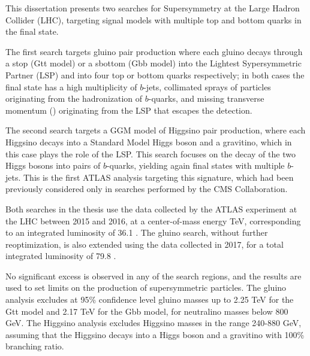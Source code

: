 This dissertation presents two searches for Supersymmetry at the Large Hadron Collider (LHC), targeting signal models with multiple top and bottom quarks in the final state.

The first search targets gluino pair production where each gluino decays through a stop
(Gtt model) or a sbottom (Gbb model) into the Lightest Sypersymmetric Partner (LSP) and into four top or bottom quarks respectively;
in both cases the final state has a high multiplicity of $b$-jets, collimated 
sprays of particles originating from the hadronization of $b$-quarks, and 
missing transverse momentum (\met) originating from the LSP  
that escapes the detection. 

The second search targets a GGM model of Higgsino pair production, 
where each Higgsino decays into a Standard Model Higgs boson and 
a gravitino, which in this case plays the role of the LSP. 
This search focuses on the decay of the two Higgs bosons into pairs of $b$-quarks, yielding again final states with multiple $b$-jets.
This is the first ATLAS analysis targeting this signature, which had been 
previously considered only in searches performed by the CMS Collaboration.

Both searches in the thesis use the data collected by the ATLAS experiment at the LHC 
between 2015 and 2016, at a center-of-mass energy  \cmtre TeV,
corresponding to an integrated luminosity of 36.1 \ifb.
The gluino search, without further reoptimization, is also extended using the data collected in 2017, 
for a total integrated luminosity of 79.8 \ifb.

No significant excess is observed in any of the search regions, 
and the results are used to 
set limits on the production of supersymmetric particles. 
The gluino analysis excludes at 95\% confidence level gluino masses up to 2.25 TeV for the Gtt model 
and 2.17 TeV for the Gbb model, for neutralino masses below 800 GeV.
The Higgsino analysis excludes Higgsino masses in the range 240-880 GeV, assuming 
that the Higgsino decays into a Higgs boson and a gravitino with 100\% branching ratio. 

